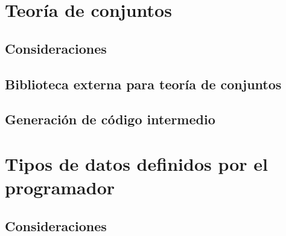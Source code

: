 
\section{Teoría de conjuntos}
\subsection{Consideraciones}
\blindtext[1]

\subsection{Biblioteca externa para teoría de conjuntos}
\blindtext[1]

\subsection{Generación de código intermedio}
\blindtext[1]

\section{Tipos de datos definidos por el programador}
\blindtext[1]
\subsection{Consideraciones}
